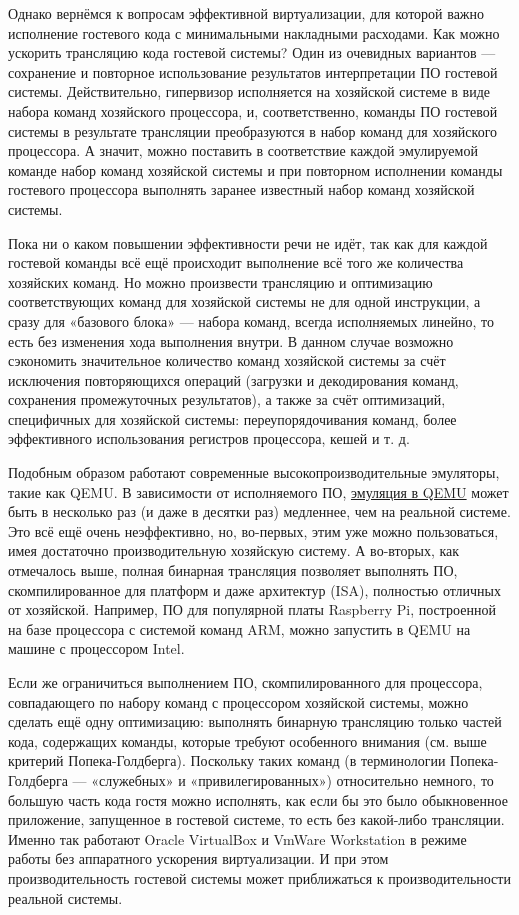 \documentclass[14pt, a4paper]{article}
\begin{document}
Однако вернёмся к вопросам эффективной виртуализации, для которой важно исполнение гостевого
кода с минимальными накладными расходами. Как можно ускорить трансляцию кода гостевой
системы? Один из очевидных вариантов — сохранение и повторное использование результатов
интерпретации ПО гостевой системы. Действительно, гипервизор исполняется на хозяйской системе в
виде набора команд хозяйского процессора, и, соответственно, команды ПО гостевой системы в
результате трансляции преобразуются в набор команд для хозяйского процессора. А значит, можно
поставить в соответствие каждой эмулируемой команде набор команд хозяйской системы и при
повторном исполнении команды гостевого процессора выполнять заранее известный набор команд
хозяйской системы.

Пока ни о каком повышении эффективности речи не идёт, так как для каждой гостевой команды всё
ещё происходит выполнение всё того же количества хозяйских команд. Но можно произвести
трансляцию и оптимизацию соответствующих команд для хозяйской системы не для одной
инструкции, а сразу для «базового блока» — набора команд, всегда исполняемых линейно, то есть
без изменения хода выполнения внутри. В данном случае возможно сэкономить значительное
количество команд хозяйской системы за счёт исключения повторяющихся операций (загрузки и
декодирования команд, сохранения промежуточных результатов), а также за счёт оптимизаций,
специфичных для хозяйской системы: переупорядочивания команд, более эффективного
использования регистров процессора, кешей и т. д.

Подобным образом работают современные высокопроизводительные эмуляторы, такие как QEMU. В
зависимости от исполняемого ПО, 
\href{https://pyra-handheld.com/boards/threads/qemu-emulation-performance-for-different-guest-architectures.80772/}{эмуляция в QEMU} 
может быть в несколько раз (и даже в десятки
раз) медленнее, чем на реальной системе. Это всё ещё очень неэффективно, но, во-первых, этим уже
можно пользоваться, имея достаточно производительную хозяйскую систему. А во-вторых, как
отмечалось выше, полная бинарная трансляция позволяет выполнять ПО, скомпилированное для
платформ и даже архитектур (ISA), полностью отличных от хозяйской. Например, ПО для популярной
платы Raspberry Pi, построенной на базе процессора с системой команд ARM, можно запустить в
QEMU на машине с процессором Intel. 

Если же ограничиться выполнением ПО, скомпилированного для процессора, совпадающего по
набору команд с процессором хозяйской системы, можно сделать ещё одну оптимизацию: выполнять
бинарную трансляцию только частей кода, содержащих команды, которые требуют особенного
внимания (см. выше критерий Попека-Голдберга). Поскольку таких команд (в терминологии
Попека-Голдберга — «служебных» и «привилегированных») относительно немного, то большую часть
кода гостя можно исполнять, как если бы это было обыкновенное приложение, запущенное в гостевой
системе, то есть без какой-либо трансляции. Именно так работают Oracle VirtualBox и VmWare
Workstation в режиме работы без аппаратного ускорения виртуализации. И при этом
производительность гостевой системы может приближаться к производительности реальной системы.
\end{document}
